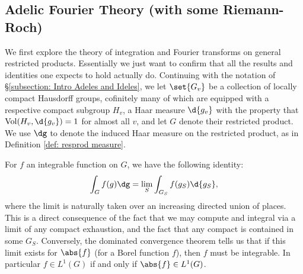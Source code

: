 \documentclass[11pt, x11names, openany]{book}
\begin{document}
\subsection{Adelic Fourier Theory (with some Riemann-Roch)}
\label{subsection: Adelic Fourier Theory}

We first explore the theory of integration and Fourier transforms on general restricted products. Essentially we just want to confirm that all the results and identities one expects to hold actually do. Continuing with the notation of \S \ref{subsection: Intro Adeles and Ideles}, we let $\set{G_v}$ be a collection of locally compact Hausdorff groups, cofinitely many of which are equipped with a respective compact subgroup $H_v$, a Haar measure $\d{g_v}$ with the property that $\vol(H_v, \d{g_v}) = 1$ for almost all $v$, and let $G$ denote their restricted product. We use $\dg$ to denote the induced Haar measure on the restricted product, as in Definition \ref{def: resprod measure}.

\begin{observation} 
    For $f$ an integrable function on $G$, we have the following identity:
    \begin{equation*}
        \int_G f(g) \dg = \lim_S \int_{G_S}f(g_S) \d{g_S},
    \end{equation*}
    where the limit is naturally taken over an increasing directed union of places. This is a direct consequence of the fact that we may compute and integral via a limit of any compact exhaustion, and the fact that any compact is contained in some $G_S$. Conversely, the dominated convergence theorem tells us that if this limit exists for $\abs{f}$ (for a Borel function $f$), then $f$ must be integrable. In particular $f \in L^1(G)$ if and only if $\abs{f} \in L^1(G)$.
\end{observation}
\end{document}
